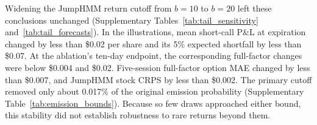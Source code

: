 Widening the JumpHMM return cutoff from $b=10$ to $b=20$ left these conclusions unchanged (Supplementary Tables~\ref{tab:tail_sensitivity} and~\ref{tab:tail_forecasts}). In the illustrations, mean short-call P\&L at expiration changed by less than \$0.02 per share and its 5\% expected shortfall by less than \$0.07. At the ablation's ten-day endpoint, the corresponding full-factor changes were below \$0.004 and \$0.02. Five-session full-factor option MAE changed by less than \$0.007, and JumpHMM stock CRPS by less than \$0.002. The primary cutoff removed only about 0.017\% of the original emission probability (Supplementary Table~\ref{tab:emission_bounds}). Because so few draws approached either bound, this stability did not establish robustness to rare returns beyond them.

\FloatBarrier

